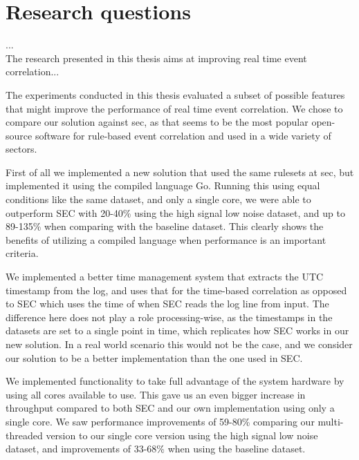 \iffalse
What if we use more rules?

\fi

\iffalse
Interpretations: what do the results mean?
Implications: why do the results matter?
Limitations: what can’t the results tell us?
Recommendations: what practical actions or scientific studies should follow?
\fi


\section{Research questions}
...\\
The research presented in this thesis aims at improving real time event correlation...


The experiments conducted in this thesis evaluated a subset of possible features that might improve the performance of real time event correlation.
We chose to compare our solution against \acrshort{sec}, as that seems to be the most popular open-source software for rule-based event correlation and used in a wide variety of sectors. 

First of all we implemented a new solution that used the same rulesets at \acrshort{sec}, but implemented it using the compiled language Go. Running this using equal conditions like the same dataset, and only a single core, we were able to outperform SEC with 20-40\% using the high signal low noise dataset, and up to 89-135\% when comparing with the baseline dataset. This clearly shows the benefits of utilizing a compiled language when performance is an important criteria.

We implemented a better time management system that extracts the UTC timestamp from the log, and uses that for the time-based correlation as opposed to SEC which uses the time of when SEC reads the log line from input. The difference here does not play a role processing-wise, as the timestamps in the datasets are set to a single point in time, which replicates how SEC works in our new solution. In a real world scenario this would not be the case, and we consider our solution to be a better implementation than the one used in SEC.

We implemented functionality to take full advantage of the system hardware by using all cores available to use. This gave us an even bigger increase in throughput compared to both SEC and our own implementation using only a single core. We saw performance improvements of 59-80\% comparing our multi-threaded version to our single core version using the high signal low noise dataset, and improvements of 33-68\% when using the baseline dataset.

